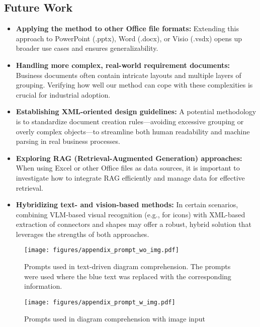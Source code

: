 \subsection{Future Work}
\begin{itemize}
\item \textbf{Applying the method to other Office file formats:} Extending this approach to PowerPoint (.pptx), Word (.docx), or Visio (.vsdx) opens up broader use cases and ensures generalizability.
\item \textbf{Handling more complex, real-world requirement documents:} Business documents often contain intricate layouts and multiple layers of grouping. Verifying how well our method can cope with these complexities is crucial for industrial adoption.
\item \textbf{Establishing XML-oriented design guidelines:} A potential methodology is to standardize document creation rules—avoiding excessive grouping or overly complex objects—to streamline both human readability and machine parsing in real business processes.
\item \textbf{Exploring RAG (Retrieval-Augmented Generation) approaches:} When using Excel or other Office files as data sources, it is important to investigate how to integrate RAG efficiently and manage data for effective retrieval.
\item \textbf{Hybridizing text- and vision-based methods:} In certain scenarios, combining VLM-based visual recognition (e.g., for icons) with XML-based extraction of connectors and shapes may offer a robust, hybrid solution that leverages the strengths of both approaches.
\end{itemize}



\begin{figure}[tbp]
    \vspace{-5pt}
    \centering
    \texttt{[image: figures/appendix\_prompt\_wo\_img.pdf]}
    \caption{\small
    Prompts used in text-driven diagram comprehension. The prompts were used where the blue text was replaced with the corresponding information.}
    \label{fig:prompt1}
\end{figure}


\begin{figure}[tbp]
    \vspace{-5pt}
    \centering
    \texttt{[image: figures/appendix\_prompt\_w\_img.pdf]}
    \caption{\small Prompts used in diagram comprehension with image input}
    \label{fig:prompt2}
    \vspace{-10pt}
\end{figure}

